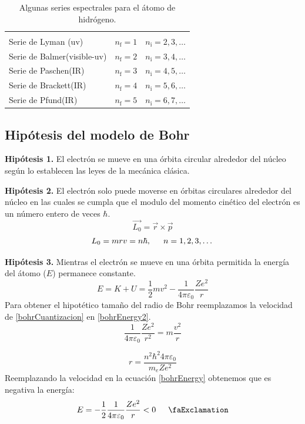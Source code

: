 \documentclass[10pt,twocolumn,titlepage]{article}
\newcommand{\ojo}{\text{\faExclamation}}
\newcommand{\inicial}{\textrm{i}}
\newcommand{\final}{\textrm{f}}
\begin{document}
\begin{table}[hb!]
\centering
\label{my-label}
\begin{tabular}{lll}
\multicolumn{3}{l}{} \\
   Serie de Lyman (uv)   & $n_\final=1$      &$n_\inicial=2,3,\dots$      \\
Serie de Balmer(visible-uv)      & $n_\final=2$      &$n_\inicial=3,4,\dots$      \\
Serie de Paschen(IR)      &$n_\final=3$       &$n_\inicial=4,5,\dots$      \\
Serie de Brackett(IR)      &$n_\final=4$       &$n_\inicial=5,6,\dots$      \\
Serie de Pfund(IR)      &$n_\final=5$       &$n_\inicial=6,7,\dots$     
\end{tabular}
\caption{Algunas series espectrales para el átomo de hidrógeno.}
\end{table}

\subsection{Hipótesis del modelo de Bohr}
\textbf{Hipótesis 1.} El electrón se mueve en una órbita circular alrededor del núcleo según lo establecen las leyes de la mecánica clásica.

\textbf{Hipótesis 2.} El electrón solo puede moverse en órbitas circulares alrededor del núcleo en las cuales se cumpla que el modulo del momento cinético del electrón es un número entero de veces $\hbar$.
$$\vec{L_0}=\vec{r}\times \vec{p} $$
\begin{equation} \label{bohrCuantizacion}
L_0=mrv=n\hbar ,\indent n=1,2,3, \dots
\end{equation}

\textbf{Hipótesis 3.} Mientras el electrón se mueve en una órbita permitida la energía del átomo ($E$) permanece constante.
\begin{equation} \label{bohrEnergy}
E=K+U=\frac{1}{2}mv^2-\frac{1}{4\pi \varepsilon_0}\frac{Z e^2}{r}
\end{equation}
Para obtener el hipotético tamaño del radio de Bohr reemplazamos la velocidad de \eqref{bohrCuantizacion} en \eqref{bohrEnergy2}.
\begin{equation} \label{bohrEnergy2}
\frac{1}{4\pi\varepsilon_0}\frac{Ze^2}{r^2}=m\frac{v^2}{r}
\end{equation}

$$r=\frac{n^2\hbar^2 4\pi \varepsilon_0}{m_eZe^2} $$
Reemplazando la velocidad en la ecuación \eqref{bohrEnergy} obtenemos que es negativa la energía:
\begin{equation}\label{bohrEnergy3}
E=-\frac{1}{2}\frac{1}{4\pi\varepsilon_0}\frac{Ze^2}{r}<0\indent \ojo
\end{equation}
\end{document}
